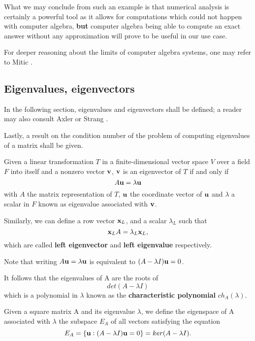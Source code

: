 What we may conclude from such an example is that numerical analysis is certainly a powerful tool as it allows for computations
which could not happen with computer algebra, \textbf{but} computer algebra being able to compute an exact answer without
any approximation will prove to be useful in our use case.

For deeper reasoning about the limits of computer algebra systems, one may refer to Mitic \cite{mitic}.

\subsection*{Eigenvalues, eigenvectors}
In the following section, eigenvalues and eigenvectors shall be defined; a reader may also consult Axler \cite{axler}
or Strang \cite{strang09}.

Lastly, a result on the condition number of the problem of computing eigenvalues of a matrix shall be given.
\begin{definition}
    Given a linear transformation \(T\) in a finite-dimensional vector space \(V\) over a field \(F\) into itself and a nonzero
    vector
    \(\vb{v}\), \(\vb{v}\) is an eigenvector of \(T\) if and only if
    \[ A \vb{u} = \lambda \vb{u} \]
    with \(A\) the matrix representation of \(T\), \(\vb{u}\) the coordinate vector of \(\vb{u}\) and \(\lambda\) a scalar in
    \(F\) known as eigenvalue associated with \(\vb{v}\).

    Similarly, we can define a row vector \(\vb{x}_{L}\), and a scalar \(\lambda_{L}\) such that
    \[\vb{x}_{L}A = \lambda_{L}\vb{x}_{L},\]
    which are called \textbf{left eigenvector} and \textbf{left eigenvalue} respectively.
\end{definition}

\begin{remark}
    Note that writing
    \( A \vb{u} = \lambda \vb{u} \) is equivalent to \( (A - \lambda I)\vb{u} = 0 \).

    It follows that the eigenvalues of A are the roots of
    \[ det(A - \lambda I) \]
    which is a polynomial in \(\lambda\) known as the \textbf{characteristic polynomial} \(ch_{A}(\lambda)\).
\end{remark}

\begin{definition}[Eigenspace]
    Given a square matrix A and its eigenvalue \(\lambda\), we define the eigenspace of A associated with \(\lambda\) the subspace
    \(E_{A}\) of all vectors satisfying the equation
    \[E_{A} = \{\vb{u}: (A - \lambda I)\vb{u} = 0\} = ker(A - \lambda I).\]
\end{definition}

